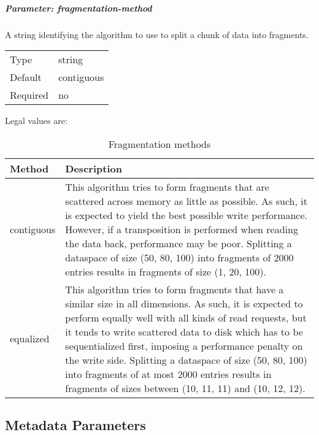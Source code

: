 \subparagraph{Parameter: fragmentation-method}
A string identifying the algorithm to use to split a chunk of data into fragments. 

\begin{preserve}
  \noindent
  \begin{tabular}{ll}
    Type     & string     \\ 
    Default  & contiguous \\ 
    Required & no         \\ 
  \end{tabular}
\end{preserve}

Legal values are:

\begin{preserve}
\begin{table}[!ht]
  \begin{center}
    \begin{tabularx}{\textwidth}{lX}
      Method     & Description \\
      \hline
      contiguous  & This algorithm tries to form fragments that are scattered across memory as little as possible. As such, it is expected to yield the best possible write performance. 
      However, if a transposition is performed when reading the data back, performance may be poor.
      Splitting a dataspace of size (50, 80, 100) into fragments of 2000 entries results in fragments of size (1, 20, 100). \\
      equalized   & This algorithm tries to form fragments that have a similar size in all dimensions. As such, it is expected to perform equally well with all kinds of read requests, but it tends to write scattered data to disk which has to be sequentialized first, imposing a performance penalty on the write side.
      Splitting a dataspace of size (50, 80, 100) into fragments of at most 2000 entries results in fragments of sizes between (10, 11, 11) and (10, 12, 12). \\
    \end{tabularx}
  \end{center}
  \caption{Fragmentation methods}%
  \label{tab:frag_methods}
\end{table}
\end{preserve}
\FloatBarrier
\vspace{\gapsize}

\subsection{Metadata Parameters}

